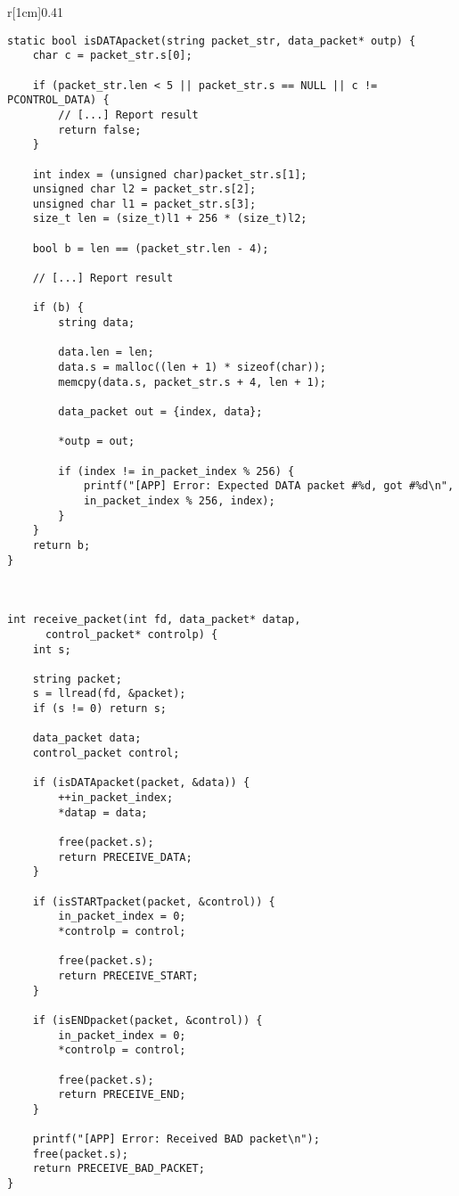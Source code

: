 \documentclass[main.tex]{subfiles}
\begin{document}
\begin{wrapfigure}[38]{r}[1cm]{0.41\textwidth}
\begin{lstlisting}[style=rcom]
static bool isDATApacket(string packet_str, data_packet* outp) {
	char c = packet_str.s[0];
	
	if (packet_str.len < 5 || packet_str.s == NULL || c != PCONTROL_DATA) {
		// [...] Report result
		return false;
	}
	
	int index = (unsigned char)packet_str.s[1];
	unsigned char l2 = packet_str.s[2];
	unsigned char l1 = packet_str.s[3];
	size_t len = (size_t)l1 + 256 * (size_t)l2;
	
	bool b = len == (packet_str.len - 4);
	
	// [...] Report result
	
	if (b) {
		string data;
		
		data.len = len;
		data.s = malloc((len + 1) * sizeof(char));
		memcpy(data.s, packet_str.s + 4, len + 1);
		
		data_packet out = {index, data};
		
		*outp = out;
		
		if (index != in_packet_index % 256) {
			printf("[APP] Error: Expected DATA packet #%d, got #%d\n",
			in_packet_index % 256, index);
		}
	}
	return b;
}



int receive_packet(int fd, data_packet* datap,
	  control_packet* controlp) {
	int s;
	
	string packet;
	s = llread(fd, &packet);
	if (s != 0) return s;
	
	data_packet data;
	control_packet control;
	
	if (isDATApacket(packet, &data)) {
		++in_packet_index;
		*datap = data;
		
		free(packet.s);
		return PRECEIVE_DATA;
	}
	
	if (isSTARTpacket(packet, &control)) {
		in_packet_index = 0;
		*controlp = control;
		
		free(packet.s);
		return PRECEIVE_START;
	}
	
	if (isENDpacket(packet, &control)) {
		in_packet_index = 0;
		*controlp = control;
		
		free(packet.s);
		return PRECEIVE_END;
	}
	
	printf("[APP] Error: Received BAD packet\n");
	free(packet.s);
	return PRECEIVE_BAD_PACKET;
}
\end{lstlisting}
\end{wrapfigure}
\end{document}
